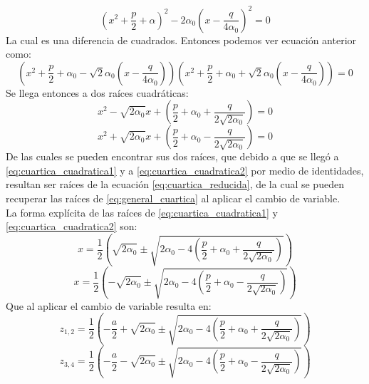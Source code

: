 \documentclass[12pt]{article}
\begin{document}
\begin{equation}
\left(x^2 +\frac{p}{2}+\alpha\right)^2 -2\alpha_0 \left(x -\frac{q}{4\alpha_0}\right)^2=0
\end{equation}
La cual es una diferencia de cuadrados. Entonces podemos ver ecuación anterior como:
\begin{equation}
\left(x^2 + \frac{p}{2}+\alpha_0 - \sqrt{2}\alpha_0 \left(x-\frac{q}{4\alpha_0}\right)\right)\left(x^2 + \frac{p}{2}+\alpha_0 + \sqrt{2}\alpha_0 \left(x-\frac{q}{4\alpha_0}\right)\right)=0
\end{equation}
Se llega entonces a dos raíces cuadráticas:
\begin{equation}
\label{eq:cuartica_cuadratica1}
x^2 -\sqrt{2\alpha_0}x+\left(\frac{p}{2}+\alpha_0 + \frac{q}{2\sqrt{2\alpha_0}}\right)=0
\end{equation}
\begin{equation}
\label{eq:cuartica_cuadratica2}
x^2 +\sqrt{2\alpha_0}x+\left(\frac{p}{2}+\alpha_0 - \frac{q}{2\sqrt{2\alpha_0}}\right)=0
\end{equation}
De las cuales se pueden encontrar sus dos raíces, que debido a que se llegó a \ref{eq:cuartica_cuadratica1} y a \ref{eq:cuartica_cuadratica2} por medio de identidades, resultan ser raíces de la ecuación \ref{eq:cuartica_reducida}, de la cual se pueden recuperar las raíces de \ref{eq:general_cuartica} al aplicar el cambio de variable.\\
La forma explícita de las raíces de \ref{eq:cuartica_cuadratica1} y \ref{eq:cuartica_cuadratica2} son:
\begin{equation}
x = \frac{1}{2}\left(\sqrt{2\alpha_0} \pm \sqrt{2\alpha_0 - 4\left(\frac{p}{2} + \alpha_0 + \frac{q}{2\sqrt{2\alpha_0}}\right)}\right)
\end{equation}
\begin{equation}
x = \frac{1}{2}\left(-\sqrt{2\alpha_0} \pm \sqrt{2\alpha_0 - 4\left(\frac{p}{2} + \alpha_0 - \frac{q}{2\sqrt{2\alpha_0}}\right)}\right)
\end{equation}
Que al aplicar el cambio de variable resulta en:
\begin{equation}
\label{eq:raiz_12_cuartica}
z_{1,2}= \frac{1}{2} \left(-\frac{a}{2} + \sqrt{2\alpha_0} \pm \sqrt{2\alpha_0 - 4\left(\frac{p}{2} + \alpha_0 + \frac{q}{2\sqrt{2\alpha_0}}\right)}\right)
\end{equation}
\begin{equation}
\label{eq;raiz_34_cuartica}
z_{3,4}= \frac{1}{2} \left(-\frac{a}{2} - \sqrt{2\alpha_0} \pm \sqrt{2\alpha_0 - 4\left(\frac{p}{2} + \alpha_0 - \frac{q}{2\sqrt{2\alpha_0}}\right)}\right)
\end{equation}
\end{document}
